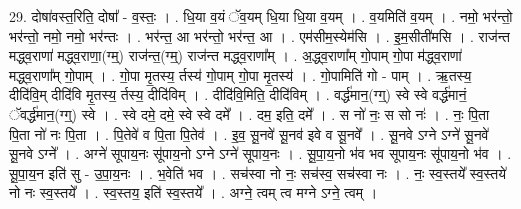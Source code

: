 \documentclass[17pt]{extarticle}
\begin{document}
29. दोषा॑वस्त॒रिति॒ दोषा᳚ - व॒स्तः॒ । . धि॒या व॒यं ॅव॒यम् धि॒या धि॒या व॒यम् । . व॒यमिति॑ व॒यम् । . नमो॒ भर॑न्तो॒ भर॑न्तो॒ नमो॒ नमो॒ भर॑न्तः । . भर॑न्त॒ आ भर॑न्तो॒ भर॑न्त॒ आ । . एम॑सीम॒स्येम॑सि । . इ॒म॒सीती॑मसि । . राज॑न्त मद्ध्व॒राणा॑ मद्ध्व॒राणा॒(ग्म्॒) राज॑न्त॒(ग्म्॒) राज॑न्त मद्ध्व॒राणा᳚म् । . अ॒द्ध्व॒राणा᳚म् गो॒पाम् गो॒पा म॑द्ध्व॒राणा॑ मद्ध्व॒राणा᳚म् गो॒पाम् । . गो॒पा मृ॒तस्य॒ र्तस्य॑ गो॒पाम् गो॒पा मृ॒तस्य॑ । . गो॒पामिति॑ गो - पाम् । . ऋ॒तस्य॒ दीदि॑वि॒म् दीदि॑वि मृ॒तस्य॒ र्तस्य॒ दीदि॑विम् । . दीदि॑वि॒मिति॒ दीदि॑विम् । . वर्द्ध॑मान॒(ग्ग्॒) स्वे स्वे वर्द्ध॑मानं॒ ॅवर्द्ध॑मान॒(ग्ग्॒) स्वे । . स्वे दमे॒ दमे॒ स्वे स्वे दमे᳚ । . दम॒ इति॒ दमे᳚ । . स नो॑ नः॒ स सो नः॑ । . नः॒ पि॒ता पि॒ता नो॑ नः पि॒ता । . पि॒तेवे॑ व पि॒ता पि॒तेव॑ । . इ॒व॒ सू॒नवे॑ सू॒नव॑ इवे व सू॒नवे᳚ । . सू॒नवे ऽग्ने ऽग्ने॑ सू॒नवे॑ सू॒नवे ऽग्ने᳚ । . अग्ने॑ सूपाय॒नः सू॑पाय॒नो ऽग्ने ऽग्ने॑ सूपाय॒नः । . सू॒पा॒य॒नो भ॑व भव सूपाय॒नः सू॑पाय॒नो भ॑व । . सू॒पा॒य॒न इति॑ सु - उ॒पा॒य॒नः । . भ॒वेति॑ भव । . सच॑स्वा नो नः॒ सच॑स्व॒ सच॑स्वा नः । . नः॒ स्व॒स्तये᳚ स्व॒स्तये॑ नो नः स्व॒स्तये᳚ । . स्व॒स्तय॒ इति॑ स्व॒स्तये᳚ । . अग्ने॒ त्वम् त्व मग्ने ऽग्ने॒ त्वम् । \newline
\end{document}
